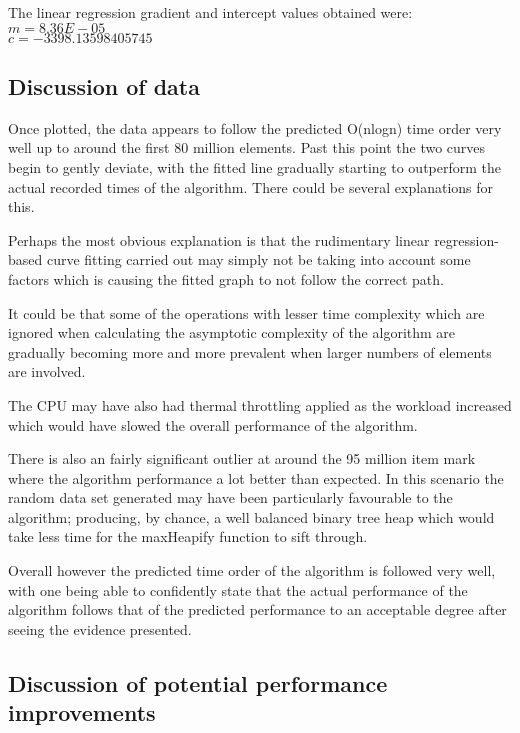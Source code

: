 \documentclass{article}
\begin{document}
\begin{center}
The linear regression gradient and intercept values obtained were: \\
  $m = 8.36E-05$ \\
  $c = -3398.13598405745$
\end{center}


\begin{center}

\end{center}

\subsection{Discussion of data}

Once plotted, the data appears to follow the predicted O(nlogn) time order very well up to around the first 80 million elements. Past this point the two curves begin to gently deviate, with the fitted line gradually starting to outperform the actual recorded times of the algorithm. There could be several explanations for this.

Perhaps the most obvious explanation is that the rudimentary linear regression-based curve fitting carried out may simply not be taking into account some factors which is causing the fitted graph to not follow the correct path.

It could be that some of the operations with lesser time complexity which are ignored when calculating the asymptotic complexity of the algorithm are gradually becoming more and more prevalent when larger numbers of elements are involved.

The CPU may have also had thermal throttling applied as the workload increased which would have slowed the overall performance of the algorithm.

There is also an fairly significant outlier at around the 95 million item mark where the algorithm performance a lot better than expected. In this scenario the random data set generated may have been particularly favourable to the algorithm; producing, by chance, a well balanced binary tree heap which would take less time for the maxHeapify function to sift through.

Overall however the predicted time order of the algorithm is followed very well, with one being able to confidently state that the actual performance of the algorithm follows that of the predicted performance to an acceptable degree after seeing the evidence presented.

\subsection{Discussion of potential performance improvements}
\end{document}
